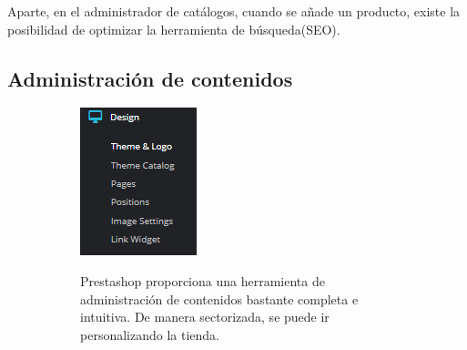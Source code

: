 \documentclass{article}
\begin{document}
Aparte, en el administrador de catálogos, cuando se añade un producto, existe la posibilidad de optimizar la herramienta de búsqueda(SEO).

\subsection{Administración de contenidos}

\begin{figure}[h!]
        \raggedright
        \begin{subfigure}[!]{0.4\textwidth} 
            \includegraphics[width=\textwidth]{images/design.png}
        \end{subfigure}       
        \begin{subfigure}[!]{0.7\textwidth} 
            Prestashop proporciona una herramienta de administración de contenidos bastante completa e intuitiva. De manera sectorizada, se puede ir personalizando la tienda.
        \end{subfigure}
    \end{figure}
    
\end{document}
